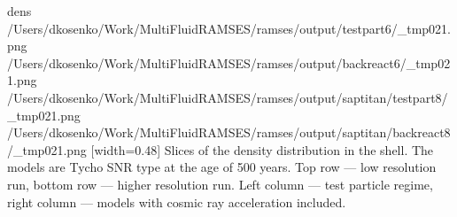 \documentclass[referee,oldversion]{aa}
\def\basedir{/Users/dkosenko/Work/MultiFluidRAMSES/ramses/output}
\begin{document}
\FIGfo dens \basedir/testpart6/_tmp021.png \basedir/backreact6/_tmp021.png  \basedir/saptitan/testpart8/_tmp021.png \basedir/saptitan/backreact8/_tmp021.png [width=0.48\hsize] Slices of the density distribution in the shell. The models are Tycho SNR type at the age of 500 years. Top row --- low resolution run, bottom row --- higher resolution run. Left column --- test particle regime, right column --- models with cosmic ray acceleration included.
 
\fi


%




%
\end{document}
